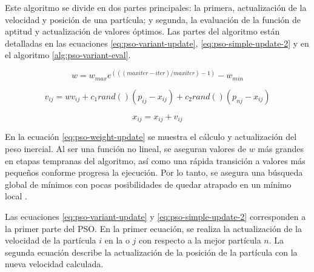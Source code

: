   Este algoritmo se divide en dos
  partes principales: la primera, actualización de la velocidad y posición de
  una partícula; y segunda, la evaluación de la función de aptitud y
  actualización de valores óptimos. Las partes del algoritmo están detalladas
  en las ecuaciones \ref{eq:pso-variant-update}, \ref{eq:pso-simple-update-2}
  y en el algoritmo \ref{alg:pso-variant-eval}.

  \begin{equation}
    \label{eq:pso-weight-update}
    w = w_{max} e^{(((maxiter - iter) / maxiter) - 1)} - w_{min} 
  \end{equation}

  \begin{equation}
    v_{ij} = w v_{ij} + c_1 rand()(p_{ij} - x_{ij}) + c_2 rand()(p_{nj}
      - x_{ij})
    \label{eq:pso-variant-update}
  \end{equation}

  \begin{equation}
    x_{ij} = x_{ij} + v_{ij}
    \label{eq:pso-simple-update-2}
  \end{equation}

  En la ecuación \ref{eq:pso-weight-update} se muestra el cálculo y
  actualización del peso inercial. Al ser una función no lineal, se aseguran
  valores de $w$ más grandes en etapas tempranas del algoritmo, así como una
  rápida transición a valores más pequeños conforme progresa la ejecución. Por
  lo tanto, se asegura una búsqueda global de mínimos con pocas posibilidades
  de quedar atrapado en un mínimo local \cite{APSO2016}. 

  Las ecuaciones \ref{eq:pso-variant-update} y \ref{eq:pso-simple-update-2}
  corresponden a la primer parte del PSO. En la primer ecuación, se realiza la
  actualización de la velocidad de la partícula $i$ en la o $j$ con
  respecto a la mejor partícula $n$. La segunda ecuación describe la
  actualización de la posición de la partícula con la nueva velocidad
  calculada.

